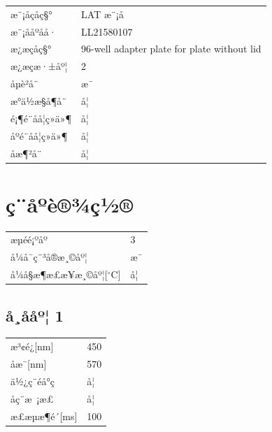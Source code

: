 \documentclass[UTF8,10pt,a4paper,fontset=fandol]{ctexart}
\newcommand{\fieldvalue}[1]{#1}
\begin{document}
\begin{tabular}{ll}
æ¨¡åçåç§° &
\fieldvalue{LAT æ¨¡å}\\
æ¨¡ååºåå· &
\fieldvalue{LL21580107}\\
æ¿æçåç§° &
\fieldvalue{96-well adapter plate for plate without lid}\\
æ¿æçæ·±åº¦ &
\fieldvalue{2}\\
å­µè²å¨ &
\fieldvalue{æ¯}\\
æ°ä½æ§å¶å¨ &
\fieldvalue{å¦}\\
é¡¶é¨åå­¦ç»ä»¶ &
\fieldvalue{å¦}\\
åºé¨åå­¦ç»ä»¶ &
\fieldvalue{å¦}\\
åæ¶²å¨ &
\fieldvalue{å¦}
\end{tabular}

\section*{ç¨åºè®¾ç½®}

\begin{tabular}{ll}
æµéé¡ºåº &
\fieldvalue{3}\\
å¼å¯ç¨³å®æ¸©åº¦ &
\fieldvalue{æ¯}\\
å¼å§æ¶æ£æ¥æ¸©åº¦[$^\circ$C] &
\fieldvalue{å¦}
\end{tabular}

\subsection*{å¸ååº¦ 1}

\begin{tabular}{ll}
æ³¢é¿[nm] &
\fieldvalue{450}\\
åæ¯[nm] &
\fieldvalue{570}\\
ä½¿ç¨éå°ç &
\fieldvalue{å¦}\\
åç¨æ ¡æ­£ &
\fieldvalue{å¦}\\
æ£æµæ¶é´[ms] &
\fieldvalue{100}
\end{tabular}
\end{document}
